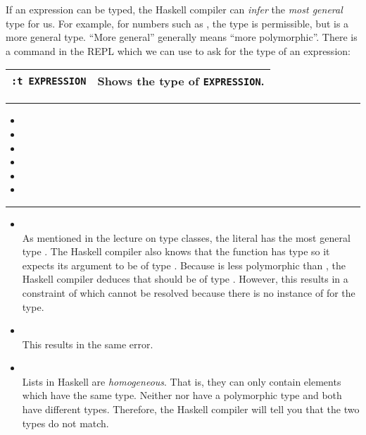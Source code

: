 If an expression can be typed, the Haskell compiler can \emph{infer} the \emph{most general} type for us. For example, for numbers such as , the  type is permissible, but  is a more general type. ``More general'' generally means ``more polymorphic''. There is a command in the REPL which we can use to ask for the type of an expression:
\begin{center}
\begin{tabular}{|l|l|}
	\hline 
	\texttt{:t EXPRESSION}   & Shows the type of \texttt{EXPRESSION}. \\ 
	\hline 
\end{tabular}  
\end{center}

\bigskip
\hrule
\bigskip

\begin{itemize}
	\item {}
	\item {}
	\item \haskellIn{[1,2,3,4,5]}
	\item \haskellIn{[]}
	\item {}
	\item {}
\end{itemize}
\bigskip
\hrule
\bigskip
{} 
\begin{itemize}
\item {} \\
As mentioned in the lecture on type classes, the literal  has the most general type . The Haskell compiler also knows that the  function has type  so it expects its argument to be of type . Because  is less polymorphic than , the Haskell compiler deduces that  should be of type . However, this results in a constraint of  which cannot be resolved because there is no instance of  for the  type.
\item \haskellIn{[1,True,3]} \\
This results in the same error.
\item \haskellIn{['a', False]} \\
Lists in Haskell are \emph{homogeneous}. That is, they can only contain elements which have the same type. Neither  nor  have a polymorphic type and both have different types. Therefore, the Haskell compiler will tell you that the two types do not match.
\end{itemize}
